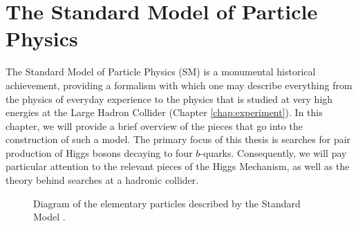 \chapter{The Standard Model of Particle Physics}
\label{chap:intro-SM}

The Standard Model of Particle Physics (SM) is a monumental historical achievement, providing a 
formalism with which one may describe everything from the physics of everyday experience to the 
physics that is studied at very high energies at the Large Hadron Collider (Chapter \ref{chap:experiment}). 
In this chapter, we will provide a brief overview of the pieces that go into the 
construction of such a model. The primary focus of this thesis is searches for pair production of 
Higgs bosons decaying to four $b$-quarks. Consequently, we will pay particular attention to the 
relevant pieces of the Higgs Mechanism, as well as the theory behind searches at a hadronic collider.

\begin{figure}[ht]
  \centering
  \caption{\label{fig:SM-fig} Diagram of the elementary particles described by the Standard Model \cite{SM-figure}.
  }
\end{figure}

